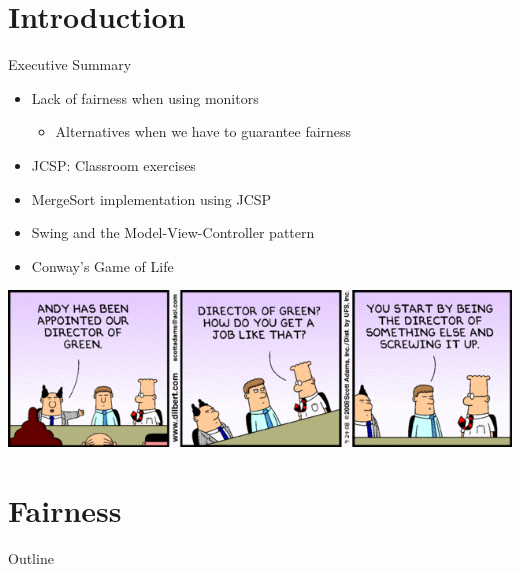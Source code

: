 \section*{Introduction}

\begin{frame}{Executive Summary}
  \begin{itemize}
  \item Lack of fairness when using monitors
    \begin{itemize}
    \item Alternatives when we have to guarantee fairness
    \end{itemize}
  \item JCSP: Classroom exercises
  \item MergeSort implementation using JCSP
  \item Swing and the Model-View-Controller pattern
  \item Conway's Game of Life
  \end{itemize}


  \begin{center}
    \includegraphics[scale=0.4]{figures/dilbert}
  \end{center}
\end{frame}


\section{Fairness}

\begin{frame}{Outline}
  \tableofcontents[current]
\end{frame}

